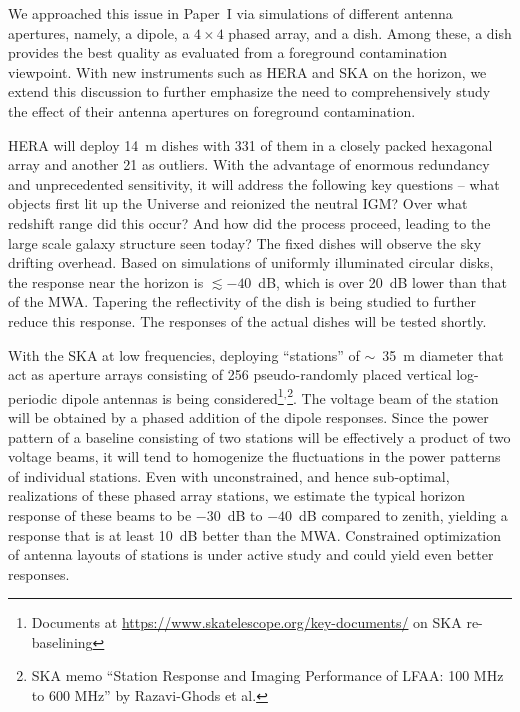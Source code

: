 \documentclass[preprint2,apjl,numberedappendix,twocolappendix,appendixfloats]{emulateapj}
\begin{document}
We approached this issue in Paper~I via simulations of different antenna apertures, namely, a dipole, a $4\times 4$ phased array, and a dish. Among these, a dish provides the best quality as evaluated from a foreground contamination viewpoint. With new instruments such as HERA and SKA on the horizon, we extend this discussion to further emphasize the need to comprehensively study the effect of their antenna apertures on foreground contamination. 



HERA will deploy 14~m dishes with 331 of them in a closely packed hexagonal array and another 21 as outliers. With the advantage of enormous redundancy and unprecedented sensitivity, it will address the following key questions -- what objects first lit up the Universe and reionized the neutral IGM? Over what redshift range did this occur? And how did the process proceed, leading to the large scale galaxy structure seen today? The fixed dishes will observe the sky drifting overhead. Based on simulations of uniformly illuminated circular disks, the response near the horizon is $\lesssim -40$~dB, which is over 20~dB lower than that of the MWA. Tapering the reflectivity of the dish is being studied to further reduce this response. The responses of the actual dishes will be tested shortly. 

With the SKA at low frequencies, deploying ``stations'' of $\sim$~35~m diameter that act as aperture arrays consisting of 256 pseudo-randomly placed vertical log-periodic dipole antennas is being considered\footnote{Documents at \url{https://www.skatelescope.org/key-documents/} on SKA re-baselining}$^,$\footnote{SKA memo ``Station Response and Imaging Performance of LFAA: 100 MHz to 600 MHz'' by Razavi-Ghods et al.}. The voltage beam of the station will be obtained by a phased addition of the dipole responses. Since the power pattern of a baseline consisting of two stations will be effectively a product of two voltage beams, it will tend to homogenize the fluctuations in the power patterns of individual stations. Even with unconstrained, and hence sub-optimal, realizations of these phased array stations, we estimate the typical horizon response of these beams to be $-30$~dB to $-40$~dB compared to zenith, yielding a response that is at least 10~dB better than the MWA. Constrained optimization of antenna layouts of stations is under active study and could yield even better responses. 
\end{document}
